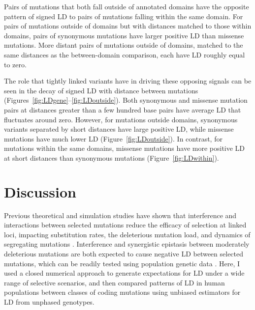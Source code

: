 \documentclass[]{article}
\begin{document}
Pairs of mutations that both fall outside of annotated domains have the
opposite pattern of signed LD to pairs of mutations falling within the same
domain. For pairs of mutations outside of domains but with distances matched to
those within domains, pairs of synonymous mutations have larger positive LD
than missense mutations. More distant pairs of mutations outside of domains,
matched to the same distances as the between-domain comparison, each have LD
roughly equal to zero.

The role that tightly linked variants have in driving these opposing signals
can be seen in the decay of signed LD with distance between mutations
(Figures~\ref{fig:LDgene}--\ref{fig:LDoutside}). Both synonymous and missense
mutation pairs at distances greater than a few hundred base pairs have average
LD that fluctuates around zero. However, for mutations outside domains,
synonymous variants separated by short distances have large positive LD, while
missense mutations have much lower LD (Figure~\ref{fig:LDoutside}). In contrast,
for mutations within the same domains, missense mutations have more positive
LD at short distances than synonymous mutations (Figure~\ref{fig:LDwithin}).

\section{Discussion}\label{sec:discussion}

Previous theoretical and simulation studies have shown that interference and
interactions between selected mutations reduce the efficacy of selection at
linked loci, impacting substitution rates, the deleterious mutation load, and
dynamics of segregating mutations
\citep{Hill1968-vu,Birky1988-jm,Barton1995-mj,McVean2000-ox}. Interference and
synergistic epistasis between moderately deleterious mutations are both
expected to cause negative LD between selected mutations, which can be readily
tested using population genetic data
\citep{Sohail2017-zq,Sandler2021-of,Garcia2021-zn}. Here, I used a closed
numerical approach to generate expectations for LD under a wide range of
selective scenarios, and then compared patterns of LD in human populations
between classes of coding mutations using unbiased estimators for LD from
unphased genotypes.
\end{document}
